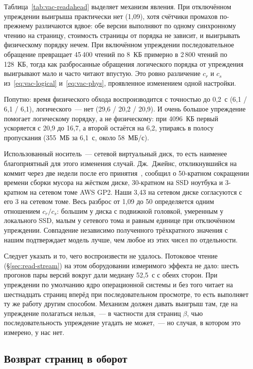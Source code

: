 Таблица~\ref{tab:vac-readahead} выделяет механизм явления. При отключённом
упреждении выигрыша практически нет (1,09), хотя счётчики промахов
по-прежнему различаются вдвое: обе версии выполняют по одному синхронному
чтению на страницу, стоимость страницы от порядка не зависит, и выигрывать
физическому порядку нечем. При включённом упреждении последовательное
обращение превращает 45\,400 чтений по 8~КБ примерно в 2\,800 чтений по
128~КБ, тогда как разбросанные обращения логического порядка от упреждения
выигрывают мало и часто читают впустую. Это ровно различение $c_r$ и $c_s$
из~\eqref{eq:vac-logical} и~\eqref{eq:vac-phys}, проявленное изменением одной
настройки.

Попутно: время физического обхода воспроизводится с точностью до 0,2~с
(6,1 / 6,1 / 6,1), логического~--- нет (29,6 / 20,2 / 20,9). И очень большое
упреждение помогает логическому порядку, а не физическому: при 4096~КБ первый
ускоряется с 20,9 до 16,7, а второй остаётся на 6,2, упираясь в полосу
пропускания (355~МБ за 6,1~с, около 58~МБ/с).

Использованный носитель~--- сетевой виртуальный диск, то есть наименее
благоприятный для этого изменения случай. Дж.~Джейнс, откликнувшийся на коммит
через две недели после его принятия~\cite{janes2019gistvacuum}, сообщил о
50-кратном сокращении времени сборки мусора на жёстком диске, 30-кратном на
SSD ноутбука и 3-кратном на сетевом томе AWS GP2. Наши 3,43 на сетевом диске
согласуются с его 3 на сетевом томе. Весь разброс от 1,09 до 50 определяется
одним отношением $c_r/c_s$: большим у диска с подвижной головкой, умеренным у
локального SSD, малым у сетевого тома и равным единице при отключённом
упреждении. Совпадение независимо полученного трёхкратного значения с нашим
подтверждает модель лучше, чем любое из этих чисел по отдельности.

Следует указать и то, чего воспроизвести не удалось. Потоковое чтение
(§\ref{sec:read-stream}) на этом оборудовании измеримого эффекта не дало: шесть
прогонов пары версий вокруг  дали медиану 52,5~с с обеих
сторон. При упреждении по умолчанию ядро операционной системы и без того читает
на шестнадцать страниц вперёд при последовательном просмотре, то есть выполняет
ту же работу другим способом. Механизм должен давать выигрыш там, где на
упреждение полагаться нельзя,~--- в частности для страниц $\beta$, чью
последовательность упреждение угадать не может,~--- но случая, в котором это
измерено, у нас нет.

\subsection{Возврат страниц в оборот}


